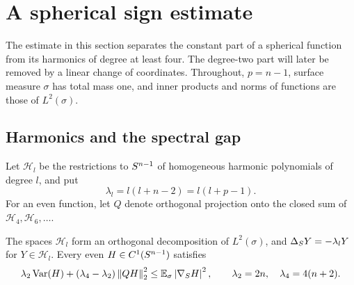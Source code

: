 \section{A spherical sign estimate}\label{sec:spherical}

The estimate in this section separates the constant part of a spherical
function from its harmonics of degree at least four.  The degree-two part
will later be removed by a linear change of coordinates.  Throughout,
$p=n-1$, surface measure $\sigma$ has total mass one, and inner products
and norms of functions are those of $L^2(\sigma)$.

\subsection{Harmonics and the spectral gap}

Let $\mathcal H_l$ be the restrictions to $S^{n-1}$ of homogeneous harmonic
polynomials of degree $l$, and put
\[
 \lambda_l=l(l+n-2)=l(l+p-1).
\]
For an even function, let $Q$ denote orthogonal projection onto the
closed sum of $\mathcal H_4,\mathcal H_6,\ldots$.

\begin{lemma}\label{lem:spherical-harmonics}
The spaces $\mathcal H_l$ form an orthogonal decomposition of
$L^2(\sigma)$, and $\Delta_S Y=-\lambda_lY$ for $Y\in\mathcal H_l$.
Every even $H\in C^1(S^{n-1})$ satisfies
\begin{equation}\label{eq:spectral-gap}
 \lambda_2\operatorname{Var}(H)+(\lambda_4-\lambda_2)\left\lVert QH\right\rVert_2^2
 \le \mathbb E_{\sigma}\left|\nabla_S H\right|^2,
 \qquad \lambda_2=2n,\quad \lambda_4=4(n+2).
\end{equation}
\end{lemma}

